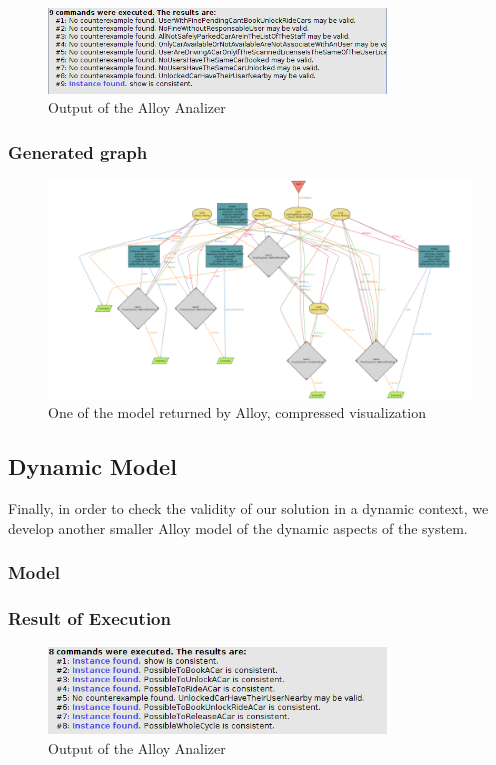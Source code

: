 \documentclass[11pt]{article} %
\begin{document}
\begin{figure}[H]
	\centering
	\includegraphics[width=0.8\textwidth]{../Alloy/ConsistentStatic.png}
	\caption{Output of the Alloy Analizer}
\end{figure}

\subsubsection{Generated graph}

\begin{figure}[H]
	\centering
	\includegraphics[width=1\textwidth]{../Alloy/Complete.png}
	\caption{One of the model returned by Alloy, compressed visualization}
\end{figure}

\subsection{Dynamic Model}

Finally, in order to check the validity of our solution in a dynamic context, we develop another smaller Alloy model of the dynamic aspects of the system.

\subsubsection{Model}


\subsubsection{Result of Execution}
\begin{figure}[H]
	\centering
	\includegraphics[width=0.8\textwidth]{../Alloy/DynamicConsistent.png}
	\caption{Output of the Alloy Analizer}
\end{figure}
\end{document}
